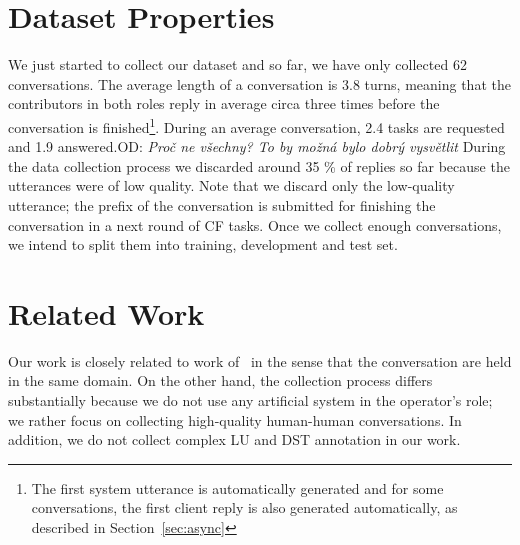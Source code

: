 \documentclass[runningheads,a4paper]{llncs}
\def\OP#1{#1}  %
\def\OD#1{{\color{darkgreen}OD: \it #1}}
\begin{document}
\section{Dataset Properties} \label{sec:props}
\vspace{-0.50em}
We just started to collect our dataset and so far, we have only collected \OP{62} conversations.
The average length of a conversation is \OP{3.8} turns, meaning that the contributors in both roles reply in average circa three times before the conversation is finished\footnote{The first system utterance is automatically generated and for some conversations, the first client reply is also generated automatically, as described in Section~\ref{sec:async}}.
During an average conversation, \OP{2.4} tasks are requested and \OP{1.9} answered.\OD{Proč ne všechny? To by možná bylo dobrý vysvětlit}
During the data collection process we discarded around \OP{35} \% of replies so far because the utterances were of low quality.
Note that we discard only the low-quality utterance; the prefix of the conversation is submitted for finishing the conversation in a next round of CF tasks.
Once we collect enough conversations, we intend to split them into training, development and test set. %


\section{Related Work} \label{sec:related}
\vspace{-0.50em}
Our work is closely related  to work of~\cite{williams2013dstc1,henderson2014dstc2,henderson2014dstc3} in the sense that the conversation are held in the same domain.
On the other hand, the collection process differs substantially because we do not use any artificial system in the operator's role;
we rather focus on collecting high-quality human-human conversations. 
In addition, we do not collect complex LU and DST annotation in our work.
\end{document}
